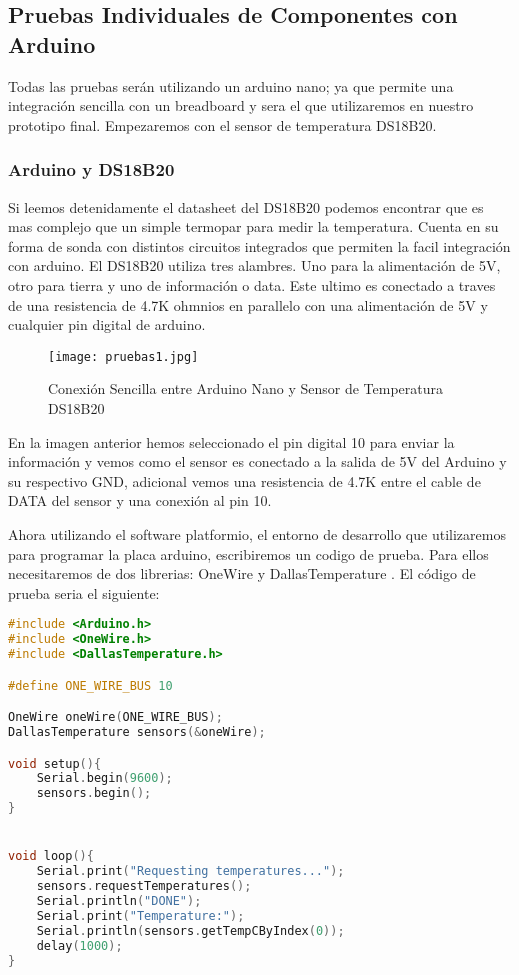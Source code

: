 \subsection{Pruebas Individuales de Componentes con Arduino }
\par \noindent
Todas las pruebas serán utilizando un arduino nano; ya que permite una integración sencilla con un breadboard y sera el que utilizaremos en nuestro prototipo final. Empezaremos con el sensor de temperatura DS18B20.

\subsubsection{Arduino y DS18B20}
\par 
Si leemos detenidamente el datasheet del DS18B20 podemos encontrar que es mas complejo que un simple termopar para medir la temperatura. Cuenta en su forma de sonda con distintos circuitos integrados que permiten la facil integración con arduino. El DS18B20 utiliza tres alambres. Uno para la alimentación de 5V, otro para tierra y uno de información o data. Este ultimo es conectado a traves de una resistencia de 4.7K ohmnios en parallelo con una alimentación de 5V y cualquier pin digital de arduino. 

\begin{figure}[H]
	\centering
	\texttt{[image: pruebas1.jpg]}
	\caption{Conexión Sencilla entre Arduino Nano y Sensor de Temperatura DS18B20}
\end{figure}

\par \noindent
En la imagen anterior hemos seleccionado el pin digital 10 para enviar la información y vemos como el sensor es conectado a la salida de 5V del Arduino y su respectivo GND, adicional vemos una resistencia de 4.7K entre el cable de DATA del sensor y una conexión al pin 10. 

\par \noindent
Ahora utilizando el software platformio, el entorno de desarrollo que utilizaremos para programar la placa arduino, escribiremos un codigo de prueba. Para ellos necesitaremos de dos librerias: OneWire \cite{onewire-github} y DallasTemperature \cite{dallas-github}. El código de prueba seria el siguiente: \\

\begin{lstlisting}[language=C++, caption={Codigo Ejemplo para DS18B20}, captionpos=b]
#include <Arduino.h>
#include <OneWire.h>
#include <DallasTemperature.h>

#define ONE_WIRE_BUS 10

OneWire oneWire(ONE_WIRE_BUS);
DallasTemperature sensors(&oneWire);

void setup(){
	Serial.begin(9600);
 	sensors.begin();
}


void loop(){
	Serial.print("Requesting temperatures...");
	sensors.requestTemperatures(); 
	Serial.println("DONE");
	Serial.print("Temperature:");
	Serial.println(sensors.getTempCByIndex(0));
	delay(1000);
}
\end{lstlisting}


